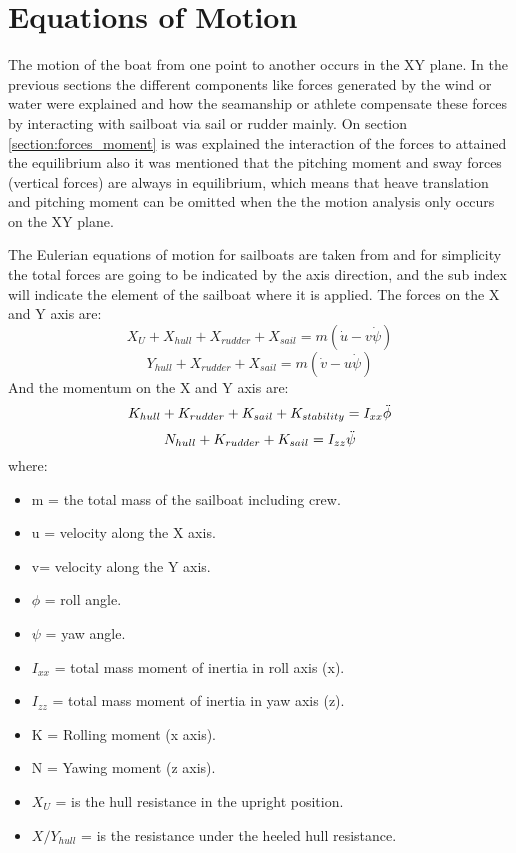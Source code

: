 \section{Equations of Motion}
The motion of the boat from one point to another occurs in the XY plane. In the previous sections the different components like forces generated by the wind or water were explained and how the seamanship or athlete compensate these forces by interacting with sailboat via sail or rudder mainly. On section \ref{section:forces_moment} is was explained the interaction of the forces to attained the equilibrium also it was mentioned that the  pitching moment and sway forces (vertical forces) are always in equilibrium, which means that heave translation  and pitching moment can be omitted when the the motion analysis only occurs on the XY plane. \par 
The Eulerian equations of motion for sailboats are taken from \cite{de2004mathematical} and for simplicity the total forces are going to be indicated by the axis direction, and the sub index will indicate the element of the sailboat where it is applied.\newline
\newline
The forces on the X and Y axis are: 
\begin{equation}\label{eq:force_X_motion}
    X_{U}+X_{hull}+X_{rudder}+X_{sail}=m(\Dot{u}-v\Dot{\psi})
\end{equation}
\begin{equation}\label{eq:force_Y_motion}
    Y_{hull}+X_{rudder}+X_{sail}=m(\Dot{v}-u\Dot{\psi})
\end{equation}
And the momentum on the X and Y axis are:
\begin{equation}\label{eq:moment_X_motion}
    K_{hull}+K_{rudder}+K_{sail}+K_{stability}=I_{xx} \Ddot{\phi}
\end{equation}
\begin{equation}\label{eq:moment_Y_motion}
    N_{hull}+K_{rudder}+K_{sail}=I_{zz} \Ddot{\psi}
\end{equation}
where: 
\begin{itemize}  \label{symbols o motions}
 \setlength \itemsep{0em}
\item m = the total mass of the sailboat including crew.
\item u = velocity along the X axis.
\item v= velocity along the Y axis.
\item $\phi$ = roll angle.
\item $\psi$ = yaw angle.
\item $I_{xx}$ = total mass moment of inertia in roll axis (x).
\item $I_{zz}$ = total mass moment of inertia in yaw axis (z).
\item K = Rolling moment (x axis).
\item N = Yawing moment (z axis).
\item $X_{U}$ = is the hull resistance in the upright position.
\item $X/Y_{hull}$ = is the resistance under the heeled hull resistance.
\end{itemize}

